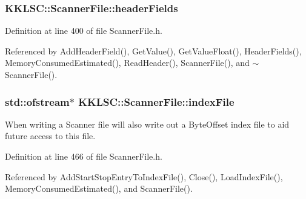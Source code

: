 \subsubsection[{\texorpdfstring{header\+Fields}{headerFields}}]{ K\+K\+L\+S\+C\+::\+Scanner\+File\+::header\+Fields\hspace{0.3cm}{\ttfamily [protected]}}\hypertarget{class_k_k_l_s_c_1_1_scanner_file_a31b2da4ffa80bf114aab2340d3104f3e}{}\label{class_k_k_l_s_c_1_1_scanner_file_a31b2da4ffa80bf114aab2340d3104f3e}


Definition at line 400 of file Scanner\+File.\+h.



Referenced by Add\+Header\+Field(), Get\+Value(), Get\+Value\+Float(), Header\+Fields(), Memory\+Consumed\+Estimated(), Read\+Header(), Scanner\+File(), and $\sim$\+Scanner\+File().

\subsubsection[{\texorpdfstring{index\+File}{indexFile}}]{\setlength{\rightskip}{0pt plus 5cm}std\+::ofstream$\ast$ K\+K\+L\+S\+C\+::\+Scanner\+File\+::index\+File\hspace{0.3cm}{\ttfamily [protected]}}\hypertarget{class_k_k_l_s_c_1_1_scanner_file_aa82349c3a370d33508267b609e543f44}{}\label{class_k_k_l_s_c_1_1_scanner_file_aa82349c3a370d33508267b609e543f44}
When writing a Scanner file will also write out a Byte\+Offset index file to aid future access to this file. 

Definition at line 466 of file Scanner\+File.\+h.



Referenced by Add\+Start\+Stop\+Entry\+To\+Index\+File(), Close(), Load\+Index\+File(), Memory\+Consumed\+Estimated(), and Scanner\+File().

